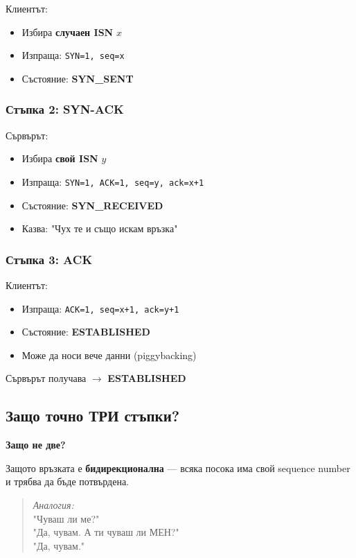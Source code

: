 \documentclass[12pt,a4paper]{article}
\begin{document}
Клиентът:
\begin{itemize}
    \item Избира \textbf{случаен ISN} $x$
    \item Изпраща: \texttt{SYN=1, seq=x}
    \item Състояние: \textbf{SYN\_SENT}
\end{itemize}

\subsubsection{Стъпка 2: SYN-ACK}

Сървърът:
\begin{itemize}
    \item Избира \textbf{свой ISN} $y$
    \item Изпраща: \texttt{SYN=1, ACK=1, seq=y, ack=x+1}
    \item Състояние: \textbf{SYN\_RECEIVED}
    \item Казва: "Чух те и също искам връзка"
\end{itemize}

\subsubsection{Стъпка 3: ACK}

Клиентът:
\begin{itemize}
    \item Изпраща: \texttt{ACK=1, seq=x+1, ack=y+1}
    \item Състояние: \textbf{ESTABLISHED}
    \item Може да носи вече данни (piggybacking)
\end{itemize}

Сървърът получава $\rightarrow$ \textbf{ESTABLISHED}

\subsection{Защо точно ТРИ стъпки?}

\textbf{Защо не две?}

Защото връзката е \textbf{бидирекционална} — всяка посока има свой sequence number и трябва да бъде потвърдена.

\begin{quote}
\textit{Аналогия:}\\
"Чуваш ли ме?"\\
\hspace*{1cm}"Да, чувам. А ти чуваш ли МЕН?"\\
\hspace*{2cm}"Да, чувам."
\end{quote}
\end{document}

